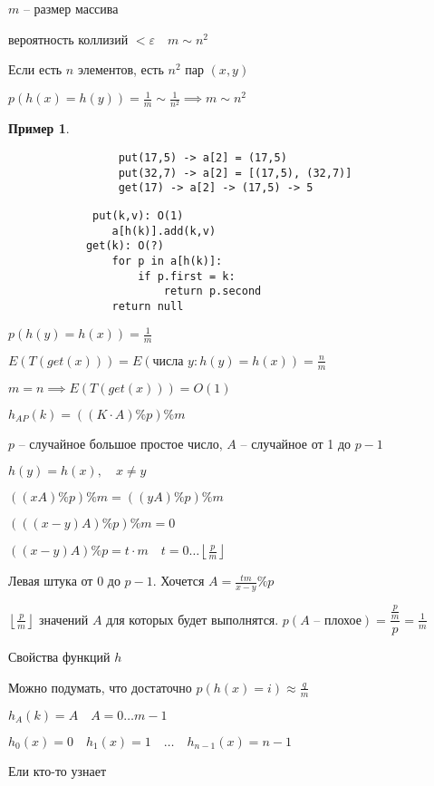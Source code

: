 \documentclass{book}
\theoremstyle{definition}
\newtheorem*{example}{Пример}
\begin{document}
\begin{enumerate}
         $m$ -- размер массива

         вероятность коллизий  $<\varepsilon\quad m\sim n^2$

         Если есть $n$ элементов, есть  $n^2$ пар $(x,y)$

         $p(h(x) = h(y)) = \frac{1}{m}\sim \frac{1}{n^2} \implies m\sim n^2$ 

         \begin{example}
             \begin{verbatim}
                 put(17,5) -> a[2] = (17,5)
                 put(32,7) -> a[2] = [(17,5), (32,7)]
                 get(17) -> a[2] -> (17,5) -> 5
             \end{verbatim}
         \end{example}

         \begin{verbatim}
             put(k,v): O(1)
                a[h(k)].add(k,v)
            get(k): O(?)
                for p in a[h(k)]:
                    if p.first = k:
                        return p.second
                return null
         \end{verbatim}

         $p\left( h(y) = h(x) \right)  = \frac{1}{m}$

         $E\left( T\left( get(x) \right)  \right)  = E\left( \text{числа } y: h(y) = h(x) \right) = \frac{n}{m} $

         $m=n \implies  E\left( T\left( get(x) \right)  \right)  = O(1)$

         $h_{AP}(k) = \left( \left( K\cdot A \right) \%p \right) \%m$ 

         $p$ -- случайное большое простое число,  $A$ -- случайное от 1 до  $p-1$

         $h(y) = h(x), \quad x\neq y$

         $\left( \left( xA \right) \%p \right) \%m = \left( \left( yA \right) \%p \right) \%m$

         $\left( \left( \left( x-y \right) A \right) \%p \right) \%m = 0$

         $\left( \left( x-y \right) A \right) \%p = t\cdot m\quad t = 0\ldots\left\lfloor \frac{p}{m} \right\rfloor$ 

         Левая штука от 0 до $p-1$. Хочется  $A = \frac{tm}{x-y}\%p$

         $\left\lfloor \frac{p}{m} \right\rfloor$ значений $A$ для которых будет выполнятся.  $p(A\text{ -- плохое}) = \dfrac{\frac{p}{m}}{p} = \frac{1}{m}$

         Свойства функций $h$

         Можно подумать, что достаточно  $p\left( h(x) = i \right)  \approx \frac{q}{m}$ 

         $h_A(k) = A\quad A = 0\ldots m-1$

         $h_0(x) = 0\quad h_1(x) = 1\quad \ldots \quad h_{n-1}(x) = n-1$

         Ели кто-то узнает 
\end{enumerate}
\end{document}
